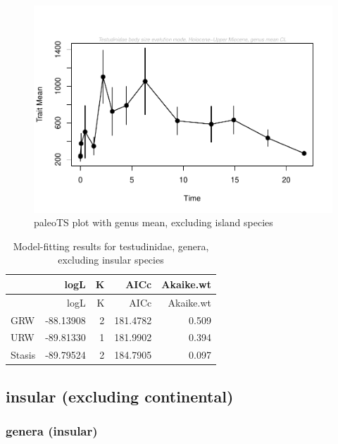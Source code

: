 \documentclass[]{article}
\begin{document}
\begin{figure}[htbp]
\centering
\includegraphics{MA_JJ_files/figure-latex/paleoTS plot with genus mean, excluding island species-1.pdf}
\caption{paleoTS plot with genus mean, excluding island species}
\end{figure}

\begin{longtable}[]{@{}lrrrr@{}}
\caption{Model-fitting results for testudinidae, genera, excluding
insular species}\tabularnewline
\toprule
& logL & K & AICc & Akaike.wt\tabularnewline
\midrule
\endfirsthead
\toprule
& logL & K & AICc & Akaike.wt\tabularnewline
\midrule
\endhead
GRW & -88.13908 & 2 & 181.4782 & 0.509\tabularnewline
URW & -89.81330 & 1 & 181.9902 & 0.394\tabularnewline
Stasis & -89.79524 & 2 & 184.7905 & 0.097\tabularnewline
\bottomrule
\end{longtable}

\newpage

\subsection{insular (excluding
continental)}\label{insular-excluding-continental}

\subsubsection{genera (insular)}\label{genera-insular}
\end{document}
